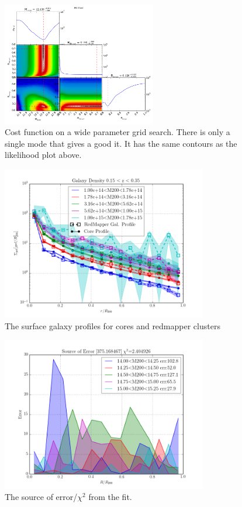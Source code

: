 \documentclass[twocolumn]{article}
\begin{document}
\begin{figure}[H]
  \center\includegraphics[width=0.6\textwidth]{figs/cfn/basic_rd_rm_wide.param/calc_likelihood_bounds.py/fig2.png}
  \caption{Cost function on a wide parameter grid search. There is only a single mode that gives a good it. It has the same
  contours as the likelihood plot above.}
  \label{fig:basic_rd_rm:cost}
\end{figure}

\begin{figure}[H]
  \center\includegraphics[width=0.8\textwidth]{figs/cfn/basic_rd_rm.param/plot_zmrs.py/fig1.png}
  \caption{The surface galaxy profiles for cores and redmapper clusters}
  \label{fig:basic_rd_rm:profile}
\end{figure}

\begin{figure}[H]
  \center\includegraphics[width=0.8\textwidth]{figs/cfn/basic_rd_rm.param/plot_zmrs.py/fig9.png}
  \caption{The source of error/$\chi^{2}$ from the fit. }
  \label{fig:basic_rd_rm:error}
\end{figure}
\end{document}
